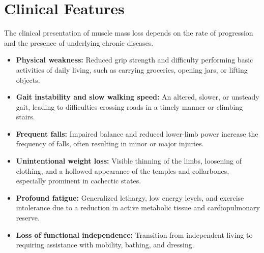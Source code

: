 \section*{Clinical Features}
The clinical presentation of muscle mass loss depends on the rate of progression and the presence of underlying chronic diseases.
\begin{itemize}
    \item \textbf{Physical weakness:} Reduced grip strength and difficulty performing basic activities of daily living, such as carrying groceries, opening jars, or lifting objects.
    \item \textbf{Gait instability and slow walking speed:} An altered, slower, or unsteady gait, leading to difficulties crossing roads in a timely manner or climbing stairs.
    \item \textbf{Frequent falls:} Impaired balance and reduced lower-limb power increase the frequency of falls, often resulting in minor or major injuries.
    \item \textbf{Unintentional weight loss:} Visible thinning of the limbs, loosening of clothing, and a hollowed appearance of the temples and collarbones, especially prominent in cachectic states.
    \item \textbf{Profound fatigue:} Generalized lethargy, low energy levels, and exercise intolerance due to a reduction in active metabolic tissue and cardiopulmonary reserve.
    \item \textbf{Loss of functional independence:} Transition from independent living to requiring assistance with mobility, bathing, and dressing.
\end{itemize}

